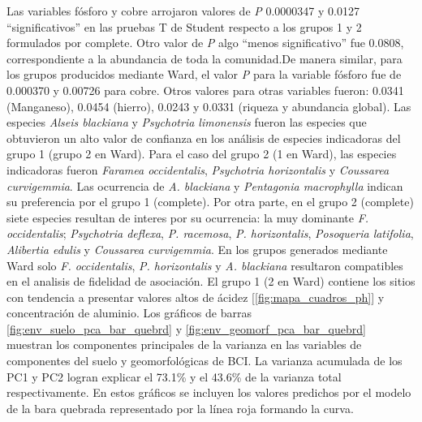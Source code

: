 \documentclass[11pt,]{article}
\begin{document}
Las variables fósforo y cobre arrojaron valores de \emph{P} 0.0000347 y
0.0127 ``significativos'' en las pruebas T de Student respecto a los
grupos 1 y 2 formulados por complete. Otro valor de \emph{P} algo
``menos significativo'' fue 0.0808, correspondiente a la abundancia de
toda la comunidad.De manera similar, para los grupos producidos mediante
Ward, el valor \emph{P} para la variable fósforo fue de 0.000370 y
0.00726 para cobre. Otros valores para otras variables fueron: 0.0341
(Manganeso), 0.0454 (hierro), 0.0243 y 0.0331 (riqueza y abundancia
global). Las especies \emph{Alseis blackiana} y \emph{Psychotria
limonensis} fueron las especies que obtuvieron un alto valor de
confianza en los análisis de especies indicadoras del grupo 1 (grupo 2
en Ward). Para el caso del grupo 2 (1 en Ward), las especies indicadoras
fueron \emph{Faramea occidentalis}, \emph{Psychotria horizontalis} y
\emph{Coussarea curvigemmia}. Las ocurrencia de \emph{A. blackiana} y
\emph{Pentagonia macrophylla} indican su preferencia por el grupo 1
(complete). Por otra parte, en el grupo 2 (complete) siete especies
resultan de interes por su ocurrencia: la muy dominante \emph{F.
occidentalis}; \emph{Psychotria deflexa}, \emph{P. racemosa}, \emph{P.
horizontalis}, \emph{Posoqueria latifolia}, \emph{Alibertia edulis} y
\emph{Coussarea curvigemmia}. En los grupos generados mediante Ward solo
\emph{F. occidentalis}, \emph{P. horizontalis} y \emph{A. blackiana}
resultaron compatibles en el analisis de fidelidad de asociación. El
grupo 1 (2 en Ward) contiene los sitios con tendencia a presentar
valores altos de ácidez {[}\ref{fig:mapa_cuadros_ph}{]} y concentración
de aluminio. Los gráficos de barras \ref{fig:env_suelo_pca_bar_quebrd} y
\ref{fig:env_geomorf_pca_bar_quebrd} muestran los componentes
principales de la varianza en las variables de componentes del suelo y
geomorfológicas de BCI. La varianza acumulada de los PC1 y PC2 logran
explicar el 73.1\% y el 43.6\% de la varianza total respectivamente. En
estos gráficos se incluyen los valores predichos por el modelo de la
bara quebrada representado por la línea roja formando la curva.
\end{document}
